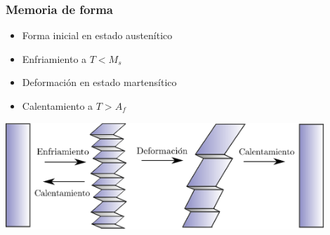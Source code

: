 \documentclass[usenames,dvipsnames]{beamer}
\begin{document}
\begin{frame}
\frametitle{Memoria de forma}

 \begin{itemize}
  \item Forma inicial en estado austenítico
  \item Enfriamiento a $T<M_{s}$
  \item Deformación en estado martensítico
  \item Calentamiento a $T>A_{f}$
 \end{itemize}


\begin{center}
\includegraphics[width=0.9\textwidth]{img/intro/Trans.eps} 
\end{center}


\end{frame}


\end{document}
